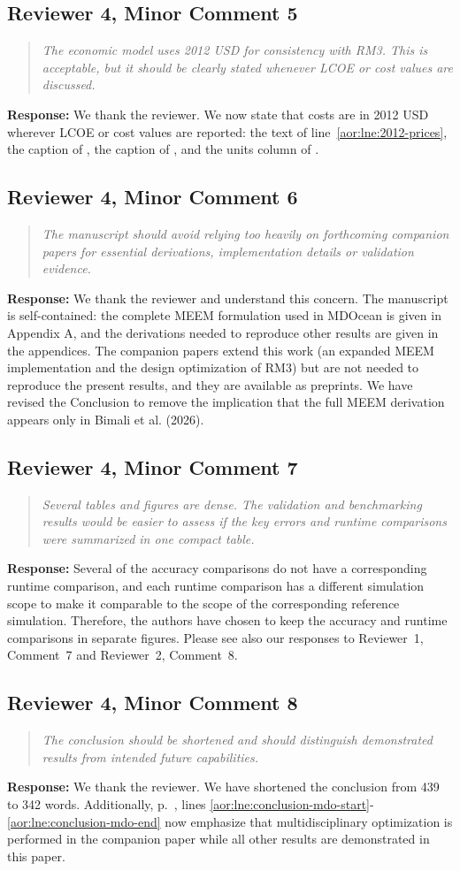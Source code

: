 \documentclass[11pt]{article}
\newcommand{\rcomment}[2]{\subsection*{#1}\begin{quote}\itshape #2\end{quote}}
\newcommand{\response}{\noindent\textbf{Response:} }
\begin{document}
\rcomment{Reviewer 4, Minor Comment 5}{The economic model uses 2012 USD for consistency with RM3. This is acceptable, but it should be clearly stated whenever LCOE or cost values are discussed.}
\response We thank the reviewer.
We now state that costs are in 2012 USD wherever LCOE or cost values are reported:
the text of line~\ref{aor:lne:2012-prices},
the caption of ,
the caption of ,
and the units column of .

\rcomment{Reviewer 4, Minor Comment 6}{The manuscript should avoid relying too heavily on forthcoming companion papers for essential derivations, implementation details or validation evidence.}
\response We thank the reviewer and understand this concern.
The manuscript is self-contained:
the complete MEEM formulation used in MDOcean is given in Appendix A, and the derivations needed to reproduce other results are given in the appendices.
The companion papers extend this work (an expanded MEEM implementation and the design optimization of RM3) but are not needed to reproduce the present results, and they are available as preprints.
We have revised the Conclusion to remove the implication that the full MEEM derivation appears only in Bimali et al. (2026).

\rcomment{Reviewer 4, Minor Comment 7}{
  Several tables and figures are dense. The validation and benchmarking results would be easier to assess if the key errors and runtime comparisons were summarized in one compact table.}
\response Several of the accuracy comparisons do not have a corresponding runtime comparison, and each runtime comparison has a different simulation scope to make it comparable to the scope of the corresponding reference simulation.
Therefore, the authors have chosen to keep the accuracy and runtime comparisons in separate figures.
Please see also our responses to Reviewer~1, Comment~7 and Reviewer~2, Comment~8.

\rcomment{Reviewer 4, Minor Comment 8}{
  The conclusion should be shortened and should distinguish demonstrated results from intended future capabilities.}
\response We thank the reviewer.
We have shortened the conclusion from 439 to 342 words.
Additionally, p.~\pageref{aor:lne:conclusion-mdo-start}, lines \ref{aor:lne:conclusion-mdo-start}-\ref{aor:lne:conclusion-mdo-end}
now emphasize that multidisciplinary optimization is performed in the companion paper \citep{aor:mccabe_leveraging_2026}
while all other results are demonstrated in this paper.
\end{document}
